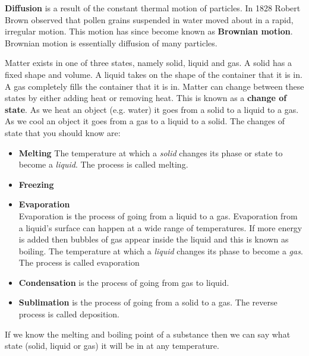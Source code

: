 \par 
\label{m38736*id10987324}\textbf{Diffusion} is a result of the constant thermal motion of particles. In 1828 Robert Brown observed that pollen grains suspended in water moved about in a rapid, irregular motion. This motion has since become known as \textbf{Brownian motion}. Brownian motion is essentially diffusion of many particles.
\par 
\label{m38736*id48327}Matter exists in one of three states, namely solid, liquid and gas. A solid has a fixed shape and volume. A liquid takes on the shape of the container that it is in. A gas completely fills the container that it is in. Matter can change between these states by either adding heat or removing heat. This is known as a \textbf{change of state}. As we heat an object (e.g. water) it goes from a solid to a liquid to a gas. As we cool an object it goes from a gas to a liquid to a solid.
The changes of state that you should know are:
\label{m38736*id02341}\begin{itemize}[noitemsep]
\item \textbf{Melting} 
 {The temperature at which a \textsl{solid} changes its phase or state to become a \textsl{liquid}. The  process is called melting. } 
\item \textbf{Freezing} 
\item \textbf{Evaporation} \\
Evaporation is the process of going from a liquid to a gas. Evaporation from a liquid's surface can happen at a wide range of temperatures. If more energy is added then bubbles of gas appear inside the liquid and this is known as boiling.
 {The temperature at which a \textsl{liquid} changes its phase to become a \textsl{gas}. The process is called evaporation} 
\item \textbf{Condensation} is the process of going from gas to liquid.
\item \textbf{Sublimation} is the process of going from a solid to a gas. The reverse process is called deposition.\end{itemize}
\par \label{m38736*eip-957}If we know the melting and boiling point of a substance then we can say what state (solid, liquid or gas) it will be in at any temperature. \par 

